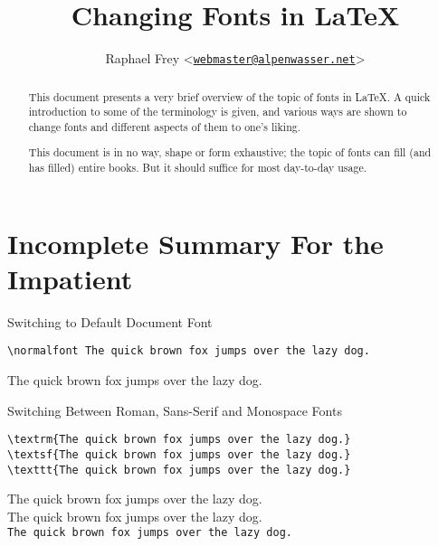 \documentclass[a4paper,oneside,11pt]{article}
\title{Changing Fonts in \LaTeX}
\author{Raphael Frey  <\href{mailto:webmaster@alpenwasser.net}{\nolinkurl{webmaster@alpenwasser.net}}>}
\begin{document}

\maketitle

\vspace{4em}

\begin{abstract}
    This document  presents a  very brief  overview of the  topic of  fonts in
    \LaTeX. A  quick introduction  to some  of the  terminology is  given, and
    various ways  are shown to change  fonts and different aspects  of them to
    one's liking.

    This document is in  no way, shape or form exhaustive;  the topic of fonts
    can fill  (and has filled)  entire books. But  it should suffice  for most
    day-to-day usage.
\end{abstract}

\vspace{4em}

\tableofcontents


\newpage
\section{Incomplete Summary For the Impatient}
\label{sec:summary}

\begin{titled-frame}
{\textsf{Switching to Default Document Font}}
\vspace{-1em}
\begin{verbatim}
\normalfont The quick brown fox jumps over the lazy dog.
\end{verbatim}
\normalfont The quick brown fox jumps over the lazy dog.
\end{titled-frame}

\begin{titled-frame}
{\textsf{Switching Between Roman, Sans-Serif and Monospace Fonts}}
\vspace{-1em}
\begin{verbatim}
\textrm{The quick brown fox jumps over the lazy dog.}
\textsf{The quick brown fox jumps over the lazy dog.}
\texttt{The quick brown fox jumps over the lazy dog.}
\end{verbatim}
\textrm{The quick brown fox jumps over the lazy dog.}\\
\textsf{The quick brown fox jumps over the lazy dog.}\\
\texttt{The quick brown fox jumps over the lazy dog.}
\end{titled-frame}
\end{document}
